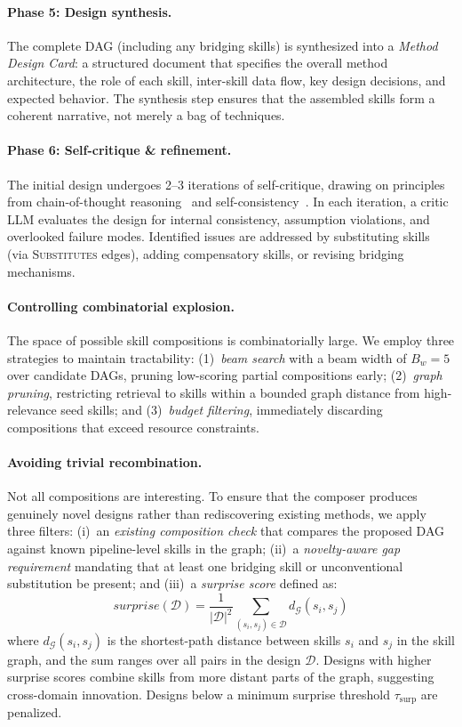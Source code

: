 \paragraph{Phase 5: Design synthesis.}
The complete DAG (including any bridging skills) is synthesized into a \emph{Method Design Card}: a structured document that specifies the overall method architecture, the role of each skill, inter-skill data flow, key design decisions, and expected behavior. The synthesis step ensures that the assembled skills form a coherent narrative, not merely a bag of techniques.

\paragraph{Phase 6: Self-critique \& refinement.}
The initial design undergoes 2--3 iterations of self-critique, drawing on principles from chain-of-thought reasoning~\cite{wei2022chain} and self-consistency~\cite{wang2023selfconsistency}. In each iteration, a critic LLM evaluates the design for internal consistency, assumption violations, and overlooked failure modes. Identified issues are addressed by substituting skills (via \textsc{Substitutes} edges), adding compensatory skills, or revising bridging mechanisms.

\paragraph{Controlling combinatorial explosion.}
The space of possible skill compositions is combinatorially large. We employ three strategies to maintain tractability: (1)~\emph{beam search} with a beam width of $B_w = 5$ over candidate DAGs, pruning low-scoring partial compositions early; (2)~\emph{graph pruning}, restricting retrieval to skills within a bounded graph distance from high-relevance seed skills; and (3)~\emph{budget filtering}, immediately discarding compositions that exceed resource constraints.

\paragraph{Avoiding trivial recombination.}
Not all compositions are interesting. To ensure that the composer produces genuinely novel designs rather than rediscovering existing methods, we apply three filters: (i)~an \emph{existing composition check} that compares the proposed DAG against known pipeline-level skills in the graph; (ii)~a \emph{novelty-aware gap requirement} mandating that at least one bridging skill or unconventional substitution be present; and (iii)~a \emph{surprise score} defined as:
\begin{equation}
\label{eq:surprise}
\textit{surprise}(\mathcal{D}) = \frac{1}{|\mathcal{D}|^2} \sum_{(s_i, s_j) \in \mathcal{D}} d_{\mathcal{G}}(s_i, s_j)
\end{equation}
where $d_{\mathcal{G}}(s_i, s_j)$ is the shortest-path distance between skills $s_i$ and $s_j$ in the skill graph, and the sum ranges over all pairs in the design $\mathcal{D}$. Designs with higher surprise scores combine skills from more distant parts of the graph, suggesting cross-domain innovation. Designs below a minimum surprise threshold $\tau_{\text{surp}}$ are penalized.


